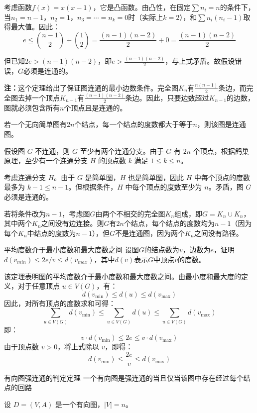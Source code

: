 考虑函数$f(x) = x(x-1)$，它是凸函数。由凸性，在固定$\sum n_i = n$的条件下，当$n_1 = n-1$，$n_2 = 1$，$n_3 = \cdots = n_k = 0$时（实际上$k=2$），和$\sum n_i(n_i-1)$取得最大值。因此：
\[
e \leqslant \binom{n-1}{2} + \binom{1}{2} = \frac{(n-1)(n-2)}{2} + 0 = \frac{(n-1)(n-2)}{2}
\]

但已知$2e > (n-1)(n-2)$，即$e > \frac{(n-1)(n-2)}{2}$，与上式矛盾。故假设错误，$G$必须是连通的。

\textbf{注：}这个定理给出了保证图连通的最小边数条件。完全图$K_n$有$\frac{n(n-1)}{2}$条边，而完全图去掉一个顶点$K_{n-1}$有$\frac{(n-1)(n-2)}{2}$条边。因此，只要边数超过$K_{n-1}$的边数，图就必须包含所有$n$个顶点且是连通的。
\begin{example}{}{}
    若一个无向简单图有$2n$个结点，每一个结点的度数都大于等于$n$，则该图是连通图。
\end{example}
假设图 $G$ 不连通，则 $G$ 至少有两个连通分支。由于 $G$ 有 $2n$ 个顶点，根据鸽巢原理，至少有一个连通分支 $H$ 的顶点数 $k$ 满足 $1 \leqslant k \leqslant n$。
    
考虑连通分支 $H$。由于 $G$ 是简单图，$H$ 也是简单图，因此 $H$ 中每个顶点的度数最多为 $k-1\leqslant n-1$。但根据条件，$H$ 中每个顶点的度数至少为 $n$。矛盾，图 $G$ 必须是连通的。

若将条件改为$n-1$，考虑图$G$由两个不相交的完全图$K_n$组成，即$G = K_n \cup K_n$，其中两个$K_n$之间没有边连接。则$G$有$2n$个结点，每个结点的度数均为$n-1$（因为每个$K_n$中结点的度数为$n-1$），但$G$不是连通图，因为两个$K_n$之间没有路径。
\begin{theorem}{平均度数介于最小度数和最大度数之间}{}
    设图$G$的结点数为$v$，边数为$e$，证明$d(v_{min})\leqslant 2e/v\leqslant d(v_{max})$，其中$d(v)$表示$G$中顶点$v$的度数。
\end{theorem}
该定理表明图的平均度数介于最小度数和最大度数之间。由最小度和最大度的定义，对于任意顶点 $u \in V(G)$，有：
    \[
    d(v_{\text{min}}) \leqslant d(u) \leqslant d(v_{\text{max}})
    \]
    因此，对所有顶点的度数求和可得：
    \[
    \sum_{u \in V(G)} d(v_{\text{min}}) \leqslant \sum_{u \in V(G)} d(u) \leqslant \sum_{u \in V(G)} d(v_{\text{max}})
    \]
    即：
    \[
    v \cdot d(v_{\text{min}}) \leqslant 2e \leqslant v \cdot d(v_{\text{max}})
    \]
    由于顶点数 $v > 0$，将上式除以 $v$，即得：
    \[
    d(v_{\text{min}}) \leqslant \frac{2e}{v} \leqslant d(v_{\text{max}})
    \]
\begin{theorem}{有向图强连通的判定定理}{}
    一个有向图是强连通的当且仅当该图中存在经过每个结点的回路
\end{theorem}
设 $D = (V, A)$ 是一个有向图，$|V| = n$。

